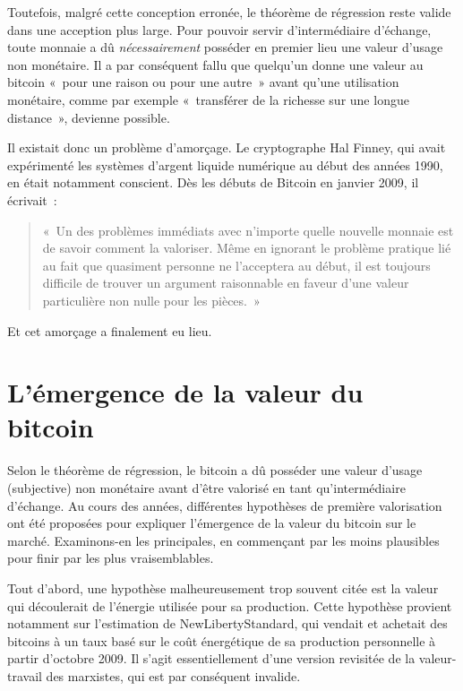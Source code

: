 Toutefois, malgré cette conception erronée, le théorème de régression reste valide dans une acception plus large. Pour pouvoir servir d'intermédiaire d'échange, toute monnaie a dû \emph{nécessairement} posséder en premier lieu une valeur d'usage non monétaire. Il a par conséquent fallu que quelqu'un donne une valeur au bitcoin «~pour une raison ou pour une autre~» avant qu'une utilisation monétaire, comme par exemple «~transférer de la richesse sur une longue distance~», devienne possible.

Il existait donc un problème d'amorçage. Le cryptographe Hal Finney, qui avait expérimenté les systèmes d'argent liquide numérique au début des années 1990, en était notamment conscient. Dès les débuts de Bitcoin en janvier 2009, il écrivait~: 

\begin{quote}
«~Un des problèmes immédiats avec n'importe quelle nouvelle monnaie est de savoir comment la valoriser. Même en ignorant le problème pratique lié au fait que quasiment personne ne l'acceptera au début, il est toujours difficile de trouver un argument raisonnable en faveur d'une valeur particulière non nulle pour les pièces.~»
\end{quote}

Et cet amorçage a finalement eu lieu. 

\section*{L'émergence de la valeur du bitcoin}

Selon le théorème de régression, le bitcoin a dû posséder une valeur d'usage (subjective) non monétaire avant d'être valorisé en tant qu'intermédiaire d'échange. Au cours des années, différentes hypothèses de première valorisation ont été proposées pour expliquer l'émergence de la valeur du bitcoin sur le marché. Examinons-en les principales, en commençant par les moins plausibles pour finir par les plus vraisemblables.


Tout d'abord, une hypothèse malheureusement trop souvent citée est la valeur qui découlerait de l'énergie utilisée pour sa production. Cette hypothèse provient notamment sur l'estimation de NewLibertyStandard, qui vendait et achetait des bitcoins à un taux basé sur le coût énergétique de sa production personnelle à partir d'octobre 2009. Il s'agit essentiellement d'une version revisitée de la valeur-travail des marxistes, qui est par conséquent invalide.

